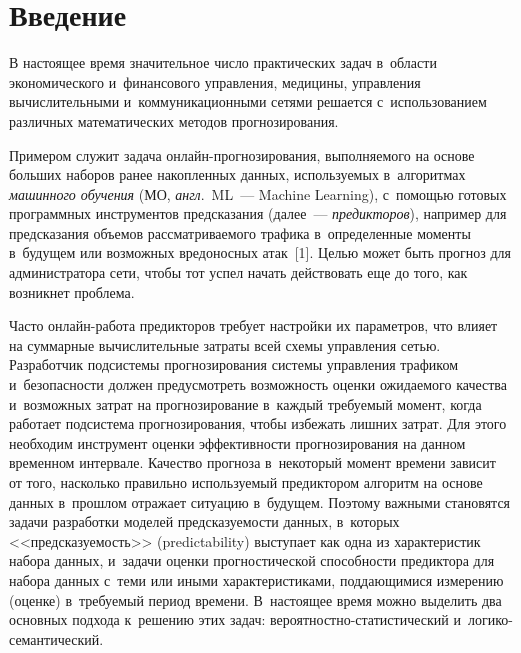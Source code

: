 
\thispagestyle{headings}

\begin{multicols}{2}

\label{st\stat}
  
  
  
\section{Введение}
 
  В настоящее время значительное число практических задач в~области 
экономического и~финансового управления, медицины, управления 
вычислительными и~коммуникационными сетями решается 
с~использованием различных математических методов прогнозирования. 
  
  Примером служит задача онлайн-прог\-но\-зи\-ро\-ва\-ния, выполняемого на 
основе больших наборов ранее накопленных данных, используемых 
в~алгоритмах \textit{машинного обучения} (МО, \textit{англ}.\ ML~--- Machine 
Learning), с~помощью готовых программных инструментов предсказания 
(далее~--- \textit{предикторов}), например для предсказания объемов 
рассматриваемого трафика в~определенные моменты в~будущем или 
возможных вредоносных атак~[1]. Целью может быть прогноз для 
администратора сети, чтобы тот успел начать действовать еще до того, как 
возникнет проблема. 
  
  Часто онлайн-работа предикторов требует настройки их параметров, что 
влияет на суммарные вычислительные затраты всей схемы управления сетью. 
Разработчик подсистемы прогнозирования системы управления трафиком 
и~безопасности должен предусмотреть возможность оценки ожидаемого 
качества и~возможных затрат на прогнозирование в~каждый требуемый 
момент, когда работает подсистема прогнозирования, чтобы избежать 
лишних затрат. Для этого необходим инструмент оценки эффективности 
прогнозирования на данном временном интервале. Качество прогноза 
в~некоторый момент времени зависит от того, насколько правильно 
используемый предиктором алгоритм на основе данных в~прошлом отражает 
ситуацию в~будущем. 
  Поэтому важными становятся задачи разработки моделей предсказуемости 
данных, в~которых <<предсказуемость>> (predictability) выступает как одна 
из характеристик набора данных, и~задачи оценки прогностической 
способности предиктора для набора данных с~теми или иными 
характеристиками, поддающимися измерению (оценке) в~тре\-бу\-емый период 
времени. В~настоящее время можно выделить два основных подхода 
к~решению этих задач: ве\-ро\-ят\-ност\-но-ста\-ти\-сти\-че\-ский 
и~ло\-ги\-ко-се\-ман\-ти\-че\-ский.
  

\end{multicols}
